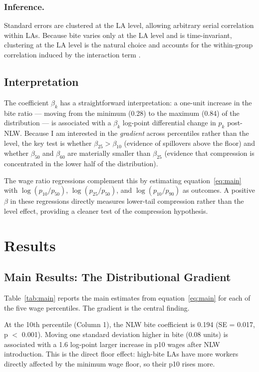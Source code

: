 \documentclass[12pt]{article}
\begin{document}
\subsubsection*{Inference.}
Standard errors are clustered at the LA level, allowing arbitrary serial correlation within LAs. Because bite varies only at the LA level and is time-invariant, clustering at the LA level is the natural choice and accounts for the within-group correlation induced by the interaction term \citep{bertrand2004how}.

\subsection{Interpretation}

The coefficient $\beta_k$ has a straightforward interpretation: a one-unit increase in the bite ratio --- moving from the minimum (0.28) to the maximum (0.84) of the distribution --- is associated with a $\beta_k$ log-point differential change in $p_k$ post-NLW. Because I am interested in the \textit{gradient} across percentiles rather than the level, the key test is whether $\beta_{25} > \beta_{10}$ (evidence of spillovers above the floor) and whether $\beta_{50}$ and $\beta_{60}$ are materially smaller than $\beta_{25}$ (evidence that compression is concentrated in the lower half of the distribution).

The wage ratio regressions complement this by estimating equation~\eqref{eq:main} with $\log(p_{10}/p_{50})$, $\log(p_{25}/p_{50})$, and $\log(p_{10}/p_{90})$ as outcomes. A positive $\beta$ in these regressions directly measures lower-tail compression rather than the level effect, providing a cleaner test of the compression hypothesis.

\section{Results}
\label{sec:results}

\subsection{Main Results: The Distributional Gradient}

Table~\ref{tab:main} reports the main estimates from equation~\eqref{eq:main} for each of the five wage percentiles. The gradient is the central finding.



At the 10th percentile (Column 1), the NLW bite coefficient is 0.194 (SE = 0.017, p $<$ 0.001). Moving one standard deviation higher in bite (0.08 units) is associated with a 1.6 log-point larger increase in p10 wages after NLW introduction. This is the direct floor effect: high-bite LAs have more workers directly affected by the minimum wage floor, so their p10 rises more.
\end{document}
